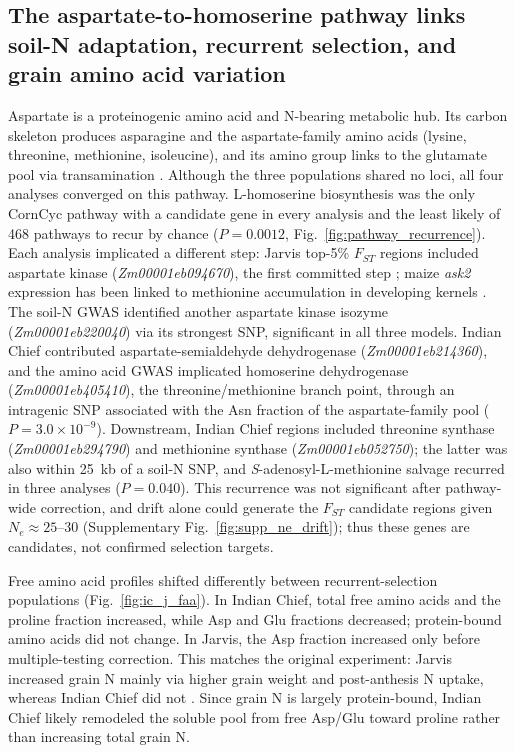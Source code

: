 \subsection{The aspartate-to-homoserine pathway links soil-N adaptation, recurrent selection, and grain amino acid variation}

Aspartate is a proteinogenic amino acid and N-bearing metabolic hub. Its carbon skeleton produces asparagine and the aspartate-family amino acids (lysine, threonine, methionine, isoleucine), and its amino group links to the glutamate pool via transamination \citep{Han2021Aspartate,Wang2018AspSeeds,Viola2001AspartatePathway}. Although the three populations shared no loci, all four analyses converged on this pathway. L-homoserine biosynthesis was the only CornCyc pathway with a candidate gene in every analysis and the least likely of 468 pathways to recur by chance ($P = 0.0012$, Fig.~\ref{fig:pathway_recurrence}). Each analysis implicated a different step: Jarvis top-5\% $F_{ST}$ regions included aspartate kinase (\textit{Zm00001eb094670}), the first committed step \citep{Viola2001AspartatePathway}; maize \textit{ask2} expression has been linked to methionine accumulation in developing kernels \citep{Duo2026Ask2}. The soil-N GWAS identified another aspartate kinase isozyme (\textit{Zm00001eb220040}) via its strongest SNP, significant in all three models. Indian Chief contributed aspartate-semialdehyde dehydrogenase (\textit{Zm00001eb214360}), and the amino acid GWAS implicated homoserine dehydrogenase (\textit{Zm00001eb405410}), the threonine/methionine branch point, through an intragenic SNP associated with the Asn fraction of the aspartate-family pool ($P = 3.0 \times 10^{-9}$). Downstream, Indian Chief regions included threonine synthase (\textit{Zm00001eb294790}) and methionine synthase (\textit{Zm00001eb052750}); the latter was also within 25~kb of a soil-N SNP, and \textit{S}-adenosyl-L-methionine salvage recurred in three analyses ($P = 0.040$). This recurrence was not significant after pathway-wide correction, and drift alone could generate the $F_{ST}$ candidate regions given $N_e \approx 25$--30 (Supplementary Fig.~\ref{fig:supp_ne_drift}); thus these genes are candidates, not confirmed selection targets.

Free amino acid profiles shifted differently between recurrent-selection populations (Fig.~\ref{fig:ic_j_faa}). In Indian Chief, total free amino acids and the proline fraction increased, while Asp and Glu fractions decreased; protein-bound amino acids did not change. In Jarvis, the Asp fraction increased only before multiple-testing correction. This matches the original experiment: Jarvis increased grain N mainly via higher grain weight and post-anthesis N uptake, whereas Indian Chief did not \citep{Moll1994}. Since grain N is largely protein-bound, Indian Chief likely remodeled the soluble pool from free Asp/Glu toward proline rather than increasing total grain N.

